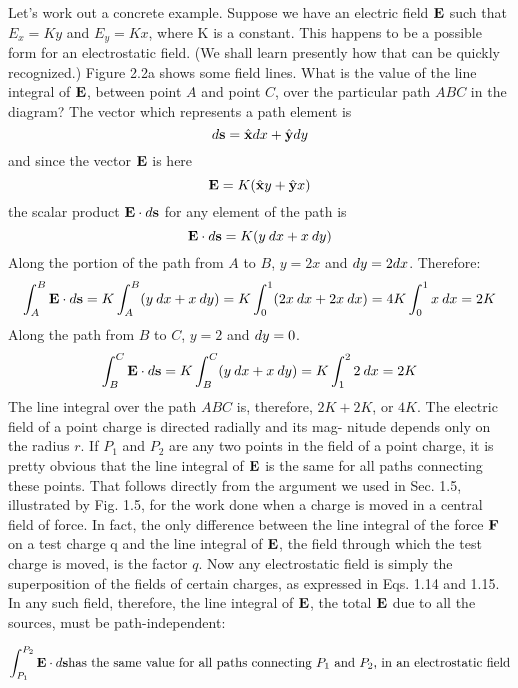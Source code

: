 Let's work out a concrete example. Suppose we have an electric
field $\mathbf{E}$ such that $E_x = Ky$ and $E_y = Kx$, where K is a constant. This
happens to be a possible form for an electrostatic field. (We shall
learn presently how that can be quickly recognized.) Figure 2.2a
shows some field lines. What is the value of the line integral of $\mathbf{E}$,
between point $A$ and point $C$, over the particular path $ABC$ in the
diagram? The vector which represents a path element is
\begin{equation}
  d \mathbf{s} = \hat{\mathbf{x}} d x + \hat{\mathbf{y}} d y
\end{equation}
and since the vector $\mathbf{E}$ is here
\begin{equation}
  \mathbf{E} = K(\hat{\mathbf{x}} y + \hat{\mathbf{y}} x)
\end{equation}
the scalar product $\mathbf{E}\cdot d\mathbf{s}$ for any element of the path is
\begin{equation}
  \mathbf{E}\cdot d\mathbf{s} = K(y\:d x + x\: d y)
\end{equation}
Along the portion of the path from $A$ to $B$, $y = 2x$ and $d y = 2 dx$.
Therefore:
\begin{equation}
  \int_A^B \mathbf{E}\cdot d\mathbf{s} = K\int_A^B  (y\:d x+x\:d y)
         = K\int_0^1(2x\:d x+2x\:d x)
         = 4K\int_0^1 x \:d x = 2K
\end{equation}
Along the path from $B$ to $C$, $y = 2$ and $d y = 0$.
\begin{equation}
  \int_B^C \mathbf{E}\cdot d\mathbf{s} = K \int_B^C(y\:d x+x\:d y) = K\int_1^22\:d x = 2K
\end{equation}
The line integral over the path $ABC$ is, therefore, $2K + 2K$, or $4K$.
The electric field of a point charge is directed radially and its mag-
nitude depends only on the radius $r$. If $P_1$ and $P_2$ are any two points
in the field of a point charge, it is pretty obvious that the line integral
of $\mathbf{E}$ is the same for all paths connecting these points. That follows
directly from the argument we used in Sec. 1.5, illustrated by Fig. 1.5,
for the work done when a charge is moved in a central field of force.
In fact, the only difference between the line integral of the force $\mathbf{F}$ on
a test charge q and the line integral of $\mathbf{E}$, the field through which the
test charge is moved, is the factor $q$. Now any electrostatic field is
simply the superposition of the fields of certain charges, as expressed
in Eqs. 1.14 and 1.15. In any such field, therefore, the line integral
of $\mathbf{E}$, the total $\mathbf{E}$ due to all the sources, must be path-independent:
\begin{framed}
\begin{equation}
  \int_{P_1}^{P_2} \mathbf{E}\cdot d\mathbf{s} \text{has the same value for all paths connecting
       $P_1$ and $P_2$, in an electrostatic field}
\end{equation}
\end{framed}

